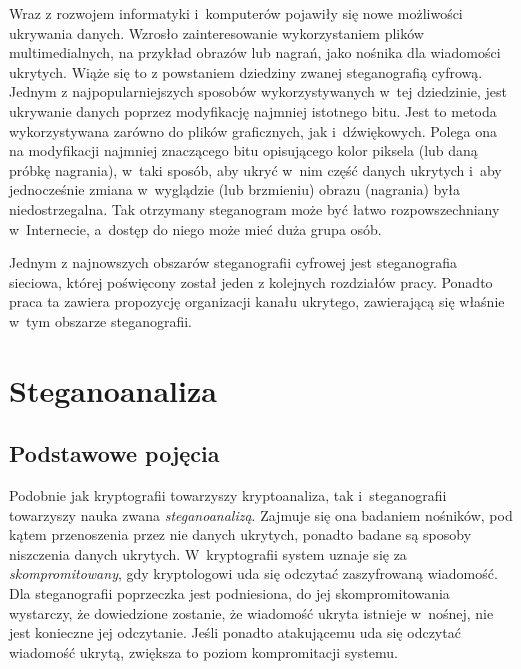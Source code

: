 \documentclass[a4paper, twoside, 12pt]{report}
\begin{document}
        Wraz z rozwojem informatyki i~komputerów pojawiły się nowe możliwości
        ukrywania danych. Wzrosło zainteresowanie wykorzystaniem plików
        multimedialnych, na przykład obrazów lub nagrań, jako nośnika dla wiadomości
        ukrytych. Wiąże się to z powstaniem dziedziny zwanej steganografią cyfrową.
        Jednym z najpopularniejszych sposobów wykorzystywanych w~tej dziedzinie,
        jest ukrywanie danych poprzez modyfikację najmniej istotnego bitu. Jest
        to metoda wykorzystywana zarówno do plików graficznych\cite{LSBSTEGANGRAPHY},
        jak i~dźwiękowych\cite{AUDIOLSBSTEGANGRAPHY}.
        Polega ona na modyfikacji najmniej znaczącego bitu opisującego kolor piksela
        (lub daną próbkę nagrania), w~taki sposób, aby ukryć w~nim część danych
        ukrytych i~aby jednocześnie zmiana w~wyglądzie (lub brzmieniu) obrazu (nagrania)
        była niedostrzegalna. Tak otrzymany steganogram może być łatwo rozpowszechniany
        w~Internecie, a~dostęp do niego może mieć duża grupa osób.

        Jednym z najnowszych obszarów steganografii cyfrowej jest steganografia
        sieciowa, której poświęcony został jeden z kolejnych rozdziałów pracy.
        Ponadto praca ta zawiera propozycję organizacji kanału ukrytego, zawierającą
        się właśnie w~tym obszarze steganografii.

    \section{Steganoanaliza}
        \subsection{Podstawowe pojęcia}
        Podobnie jak kryptografii towarzyszy kryptoanaliza, tak i~steganografii
        towarzyszy nauka zwana \emph{steganoanalizą}. Zajmuje się ona badaniem
        nośników, pod kątem przenoszenia przez nie danych ukrytych, ponadto badane
        są sposoby niszczenia danych ukrytych. W~kryptografii system uznaje się
        za \emph{skompromitowany}, gdy kryptologowi uda się odczytać zaszyfrowaną wiadomość.
        Dla steganografii poprzeczka jest podniesiona, do jej skompromitowania wystarczy,
        że dowiedzione zostanie, że wiadomość ukryta istnieje w~nośnej, nie jest
        konieczne jej odczytanie. Jeśli ponadto atakującemu uda się odczytać wiadomość
        ukrytą, zwiększa to poziom kompromitacji systemu.
\end{document}
